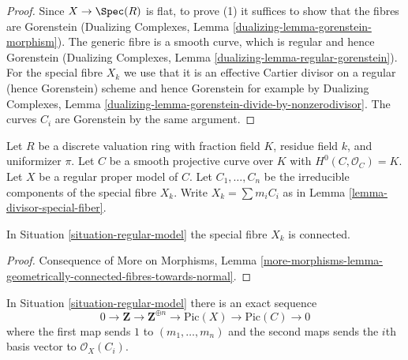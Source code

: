 \begin{proof}
Since $X \to \Spec(R)$ is flat, to prove (1)
it suffices to show that the fibres are Gorenstein
(Dualizing Complexes, Lemma \ref{dualizing-lemma-gorenstein-morphism}).
The generic fibre is a smooth curve, which is regular and hence Gorenstein
(Dualizing Complexes, Lemma \ref{dualizing-lemma-regular-gorenstein}).
For the special fibre $X_k$ we use that it is an effective
Cartier divisor on a regular (hence Gorenstein) scheme and hence
Gorenstein for example by Dualizing Complexes, Lemma
\ref{dualizing-lemma-gorenstein-divide-by-nonzerodivisor}.
The curves $C_i$ are Gorenstein by the same argument.
\end{proof}

\begin{situation}
\label{situation-regular-model}
Let $R$ be a discrete valuation ring with fraction field $K$,
residue field $k$, and uniformizer $\pi$.
Let $C$ be a smooth projective curve over $K$ with $H^0(C, \mathcal{O}_C) = K$.
Let $X$ be a regular proper model of $C$.
Let $C_1, \ldots, C_n$ be the irreducible components of the special
fibre $X_k$. Write $X_k = \sum m_i C_i$ as in
Lemma \ref{lemma-divisor-special-fiber}.
\end{situation}

\begin{lemma}
\label{lemma-regular-model-connected}
In Situation \ref{situation-regular-model} the special fibre $X_k$ is connected.
\end{lemma}

\begin{proof}
Consequence of More on Morphisms, Lemma
\ref{more-morphisms-lemma-geometrically-connected-fibres-towards-normal}.
\end{proof}

\begin{lemma}
\label{lemma-regular-model-pic}
In Situation \ref{situation-regular-model} there is an exact sequence
$$
0 \to \mathbf{Z} \to \mathbf{Z}^{\oplus n} \to
\text{Pic}(X) \to \text{Pic}(C) \to 0
$$
where the first map sends $1$ to $(m_1, \ldots, m_n)$ and the second
maps sends the $i$th basis vector to $\mathcal{O}_X(C_i)$.
\end{lemma}

